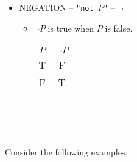 \begin{itemize}
\begin{itemize}
\begin{center}
\begin{tabular}{c|c|c}
                    \end{tabular}
                    \end{center}
                    \vphantom
                    \\
                \end{itemize}
            \pagebreak
            \item NEGATION -- \texttt{"not \(P\)"} -- \(\neg\)
                \begin{itemize}
                    \item \(\neg P\) is true when \(P\) is false.
                    \\
                    \begin{center}
                    \begin{tabular}{c|c}
                        \hline
                        \(P\) & \(\neg P\) \\
                        \hline
                        T & F \\
                        F & T \\
                        \hline
                    \end{tabular}
                    \end{center}
                    \vphantom
                    \\
                \end{itemize}
        \end{itemize}
        \vphantom
        \\
        \\
        Consider the following examples.
